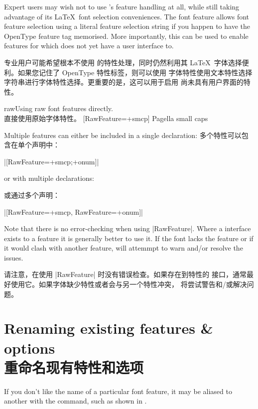 \documentclass[a4paper]{l3doc}
\begin{document}
Expert users may wish not to use 's feature handling at all,
while still taking advantage of its \LaTeX\ font selection conveniences. The
 font feature allows font feature selection using a literal feature
selection string if you happen to have the OpenType feature tag memorised.
More importantly, this can be used to enable features for which 
does not yet have a user interface to.

专业用户可能希望根本不使用  的特性处理，同时仍然利用其 \LaTeX\ 字体选择便利。如果您记住了 OpenType 特性标签，则可以使用  字体特性使用文本特性选择字符串进行字体特性选择。更重要的是，这可以用于启用  尚未具有用户界面的特性。


\begin{Xexample}{raw}{Using raw font features directly.\\直接使用原始字体特性。}
  [RawFeature=+smcp]
  Pagella small caps
\end{Xexample}

Multiple features can either be included in a single declaration:
多个特性可以包含在单个声明中：\par
\par
{\centering|[RawFeature=+smcp;+onum]|\par}
\noindent or with multiple declarations:\par
\noindent 或通过多个声明：\par
{\centering|[RawFeature=+smcp, RawFeature=+onum]|\par}

Note that there is no error-checking when using |RawFeature|. Where a 
interface exists to a feature it is generally better to use it. If the font lacks the feature
or if it would clash with another feature,  will attemmpt to warn and/or resolve the issues.

请注意，在使用 |RawFeature| 时没有错误检查。如果存在到特性的  接口，通常最好使用它。如果字体缺少特性或者会与另一个特性冲突， 将尝试警告和/或解决问题。

\section{Renaming existing features \& options\\重命名现有特性和选项}
\label{sec:aliasfontfeature}

\DescribeMacro{\aliasfontfeature}
If you don't like the name of a particular font feature,
it may be aliased to another with the
 command,
such as shown in .
\end{document}
